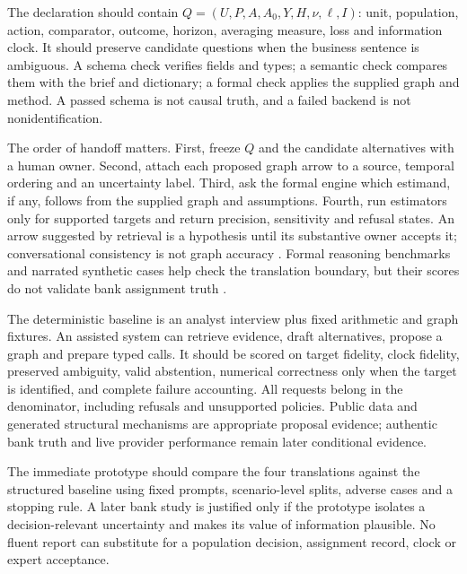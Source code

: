 The declaration should contain $Q=(U,P,A,A_0,Y,H,\nu,\ell,I)$: unit, population, action, comparator, outcome, horizon, averaging measure, loss and information clock. It should preserve candidate questions when the business sentence is ambiguous. A schema check verifies fields and types; a semantic check compares them with the brief and dictionary; a formal check applies the supplied graph and method. A passed schema is not causal truth, and a failed backend is not nonidentification.

The order of handoff matters. First, freeze $Q$ and the candidate alternatives with a human owner. Second, attach each proposed graph arrow to a source, temporal ordering and an uncertainty label. Third, ask the formal engine which estimand, if any, follows from the supplied graph and assumptions. Fourth, run estimators only for supported targets and return precision, sensitivity and refusal states. An arrow suggested by retrieval is a hypothesis until its substantive owner accepts it; conversational consistency is not graph accuracy \citep{v12_la_2305_00050,exec13_hallucination}. Formal reasoning benchmarks and narrated synthetic cases help check the translation boundary, but their scores do not validate bank assignment truth \citep{v12_la_2312_04350,v12_la_2607_08093}.

The deterministic baseline is an analyst interview plus fixed arithmetic and graph fixtures. An assisted system can retrieve evidence, draft alternatives, propose a graph and prepare typed calls. It should be scored on target fidelity, clock fidelity, preserved ambiguity, valid abstention, numerical correctness only when the target is identified, and complete failure accounting. All requests belong in the denominator, including refusals and unsupported policies. Public data and generated structural mechanisms are appropriate proposal evidence; authentic bank truth and live provider performance remain later conditional evidence.

The immediate prototype should compare the four translations against the structured baseline using fixed prompts, scenario-level splits, adverse cases and a stopping rule. A later bank study is justified only if the prototype isolates a decision-relevant uncertainty and makes its value of information plausible. No fluent report can substitute for a population decision, assignment record, clock or expert acceptance.
